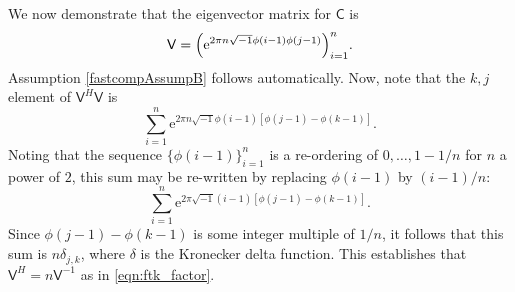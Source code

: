 \documentclass{iitthesis}          %
\newcommand{\mC}{\mathsf{C}}
\newcommand{\mV}{\mathsf{V}}
\newcommand{\me}{\mathrm{e}}
\begin{document}
We now demonstrate that the eigenvector matrix for $\mC$ is 
\begin{equation} \label{latticeVdef}
\mV = \Bigl ( \me^{2 \pi n \sqrt{-1} \phi(i-1)\phi(j-1)} \Bigr)_{i = 1}^n.
\end{equation}
Assumption \eqref{fastcompAssumpB} follows automatically.
Now, note that the $k,j$ element of $\mV^H\mV$ is
\begin{equation*}
\sum_{i=1}^n \me^{2 \pi n \sqrt{-1} \phi(i-1)[\phi(j-1) - \phi(k-1)]}.
\end{equation*}
Noting that the sequence $\{\phi(i-1)\}_{i=1}^n$ is a re-ordering of $0, \ldots, 1-1/n$ for $n$ a power of $2$, this sum may be re-written by replacing $\phi(i-1)$ by $(i-1)/n$:
\begin{equation*}
\sum_{i=1}^n \me^{2 \pi \sqrt{-1} (i-1)[\phi(j-1) - \phi(k-1)]}.
\end{equation*}
Since $\phi(j-1) - \phi(k-1)$ is some integer multiple of $1/n$, it follows that this sum is $n \delta_{j,k}$, where $\delta$ is the Kronecker delta function.  This establishes that $\mV^H = n \mV^{-1}$ as in \eqref{eqn:ftk_factor}.
\end{document}
